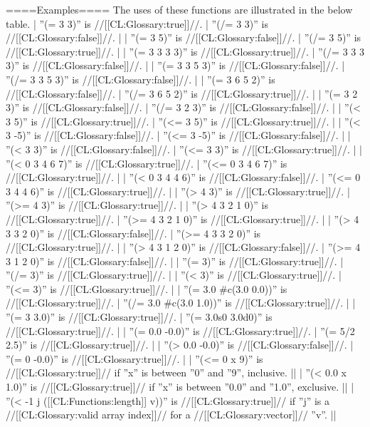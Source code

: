 ====Examples====
The uses of these functions are illustrated in the below table.
| ''(= 3 3)'' is //[[CL:Glossary:true]]//.             | ''(/= 3 3)'' is //[[CL:Glossary:false]]//.            |
| ''(= 3 5)'' is //[[CL:Glossary:false]]//.            | ''(/= 3 5)'' is //[[CL:Glossary:true]]//.             |
| ''(= 3 3 3 3)'' is //[[CL:Glossary:true]]//.         | ''(/= 3 3 3 3)'' is //[[CL:Glossary:false]]//.        |
| ''(= 3 3 5 3)'' is //[[CL:Glossary:false]]//.        | ''(/= 3 3 5 3)'' is //[[CL:Glossary:false]]//.        |
| ''(= 3 6 5 2)'' is //[[CL:Glossary:false]]//.        | ''(/= 3 6 5 2)'' is //[[CL:Glossary:true]]//.         |
| ''(= 3 2 3)'' is //[[CL:Glossary:false]]//.          | ''(/= 3 2 3)'' is //[[CL:Glossary:false]]//.          |
| ''(< 3 5)'' is //[[CL:Glossary:true]]//.             | ''(<= 3 5)'' is //[[CL:Glossary:true]]//.             |
| ''(< 3 -5)'' is //[[CL:Glossary:false]]//.           | ''(<= 3 -5)'' is //[[CL:Glossary:false]]//.           |
| ''(< 3 3)'' is //[[CL:Glossary:false]]//.            | ''(<= 3 3)'' is //[[CL:Glossary:true]]//.             |
| ''(< 0 3 4 6 7)'' is //[[CL:Glossary:true]]//.       | ''(<= 0 3 4 6 7)'' is //[[CL:Glossary:true]]//.       |
| ''(< 0 3 4 4 6)'' is //[[CL:Glossary:false]]//.      | ''(<= 0 3 4 4 6)'' is //[[CL:Glossary:true]]//.       |
| ''(> 4 3)'' is //[[CL:Glossary:true]]//.             | ''(>= 4 3)'' is //[[CL:Glossary:true]]//.             |
| ''(> 4 3 2 1 0)'' is //[[CL:Glossary:true]]//.       | ''(>= 4 3 2 1 0)'' is //[[CL:Glossary:true]]//.       |
| ''(> 4 3 3 2 0)'' is //[[CL:Glossary:false]]//.      | ''(>= 4 3 3 2 0)'' is //[[CL:Glossary:true]]//.       |
| ''(> 4 3 1 2 0)'' is //[[CL:Glossary:false]]//.      | ''(>= 4 3 1 2 0)'' is //[[CL:Glossary:false]]//.      |
| ''(= 3)'' is //[[CL:Glossary:true]]//.               | ''(/= 3)'' is //[[CL:Glossary:true]]//.               |
| ''(< 3)'' is //[[CL:Glossary:true]]//.               | ''(<= 3)'' is //[[CL:Glossary:true]]//.               |
| ''(= 3.0 #c(3.0 0.0))'' is //[[CL:Glossary:true]]//. | ''(/= 3.0 #c(3.0 1.0))'' is //[[CL:Glossary:true]]//. |
| ''(= 3 3.0)'' is //[[CL:Glossary:true]]//.           | ''(= 3.0s0 3.0d0)'' is //[[CL:Glossary:true]]//.      |
| ''(= 0.0 -0.0)'' is //[[CL:Glossary:true]]//.        | ''(= 5/2 2.5)'' is //[[CL:Glossary:true]]//.          |
| ''(> 0.0 -0.0)'' is //[[CL:Glossary:false]]//.       | ''(= 0 -0.0)'' is //[[CL:Glossary:true]]//.           |
| ''(<= 0 x 9)'' is //[[CL:Glossary:true]]// if ''x'' is between ''0'' and ''9'', inclusive.                  ||
| ''(< 0.0 x 1.0)'' is //[[CL:Glossary:true]]// if ''x'' is between ''0.0'' and ''1.0'', exclusive.           ||
| ''(< -1 j ([[CL:Functions:length]] v))'' is //[[CL:Glossary:true]]// if ''j'' is a //[[CL:Glossary:valid array index]]// for a //[[CL:Glossary:vector]]// ''v''. ||


